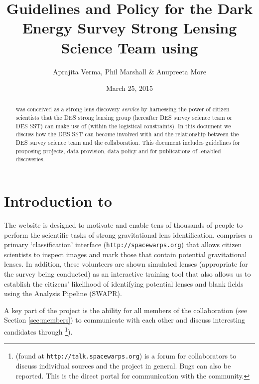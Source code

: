 \documentclass[a4paper,twocolumn]{article}
\begin{document}
             
\title{Guidelines and Policy for the Dark Energy Survey Strong Lensing Science Team using \SW}
\author{Aprajita Verma, Phil Marshall \& Anupreeta More}
\date{March 25, 2015}
\maketitle


\begin{abstract} 
\noindent \SW was conceived as a strong lens
discovery {\it service} by harnessing the power of citizen scientists that the DES strong lensing group (hereafter DES survey science team or DES SST) can make use of
(within the logistical constraints). In this document we discuss how the DES SST can become involved with \SW and the relationship
between the DES survey science team and the \SW collaboration. 
This document includes guidelines for proposing projects, data provision, data policy and for publications of \SW-enabled discoveries.
\end{abstract}

\setcounter{footnote}{0}


\section{Introduction to \SW}

The \SW website is designed to motivate and  enable tens of thousands of
people to perform the scientific tasks of strong gravitational lens
identification.  \SW comprises a primary `classification' interface (\texttt{http://spacewarps.org}) that allows citizen scientists to inspect images and mark those that contain potential gravitational lenses. In addition, these volunteers are shown simulated lenses (appropriate for the survey being conducted) as an interactive training tool that also allows us to establish the citizens' likelihood of identifying potential lenses and blank fields using the \SW Analysis Pipeline (SWAPR). 

A key part of the \SW project is the ability for all members of the \SW collaboration (see Section \ref{sec:members}) to communicate with each other and discuss interesting candidates through \Talk\footnote{\Talk (found at \texttt{http://talk.spacewarps.org}) is a forum for \SW collaborators to discuss individual sources and the \SW project in general. Bugs can also be reported. This is the direct portal for communication with the \SW community.}).
\end{document}
